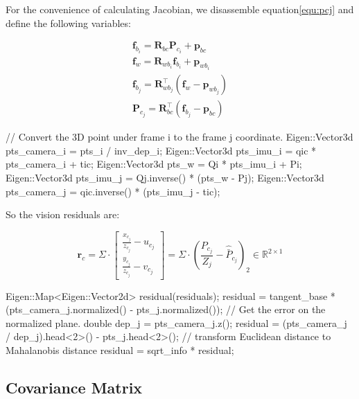 \documentclass[12pt]{report}   %
\begin{document}
For the convenience of calculating Jacobian, we disassemble equation\ref{equ:pcj} and define the following variables:

\begin{equation}
\label{equ:f_predef}
\begin{array}{l}
{\mathbf{f}_{b_{i}}=\mathbf{R}_{b c} \mathbf{P}_{c_{i}}+\mathbf{p}_{b c}} \\ {\mathbf{f}_{w}=\mathbf{R}_{w b_{i}} \mathbf{f}_{b_{i}}+\mathbf{p}_{w b_{i}}} \\ {\mathbf{f}_{b_{j}}=\mathbf{R}_{w b_{j}}^{\top}\left(\mathbf{f}_{w}-\mathbf{p}_{w b_{j}}\right)} \\
{\mathbf{P}_{c_{j}}=\mathbf{R}_{b c}^{\top}\left(\mathbf{f}_{b_{j}}-\mathbf{p}_{b c}\right)}
\end{array}
\end{equation}

\begin{cppcode}
// Convert the 3D point under frame i to the frame j coordinate.
Eigen::Vector3d pts_camera_i = pts_i / inv_dep_i;
Eigen::Vector3d pts_imu_i    = qic * pts_camera_i + tic;
Eigen::Vector3d pts_w        = Qi * pts_imu_i + Pi;     
Eigen::Vector3d pts_imu_j    = Qj.inverse() * (pts_w - Pj); 
Eigen::Vector3d pts_camera_j = qic.inverse() * (pts_imu_j - tic);
\end{cppcode}

So the vision residuals are:

\begin{equation}
\label{equ:residual_visual}
\mathbf{r}_{c} =
\Sigma \cdot
\left[\begin{array}{c}
{\frac{x_{c_{j}}}{z_{c_{j}}}-u_{c_{j}}} \\ 
{\frac{y_{c_{j}}}{z_{c_{j}}}-v_{c_{j}}}
\end{array}\right] =
\Sigma \cdot
\left(\frac{P_{c_{j}}}{Z_j} - \hat{\bar{P}}_{c_{j}}\right)_2
\in \mathbb{R}^{2 \times 1}
\end{equation}


\begin{cppcode}
Eigen::Map<Eigen::Vector2d> residual(residuals);
residual =  tangent_base * (pts_camera_j.normalized() - pts_j.normalized());
// Get the error on the normalized plane.
double dep_j = pts_camera_j.z();
residual = (pts_camera_j / dep_j).head<2>() - pts_j.head<2>();
// transform Euclidean distance to Mahalanobis distance
residual = sqrt_info * residual; 
\end{cppcode}


\subsection{Covariance Matrix}
\end{document}

